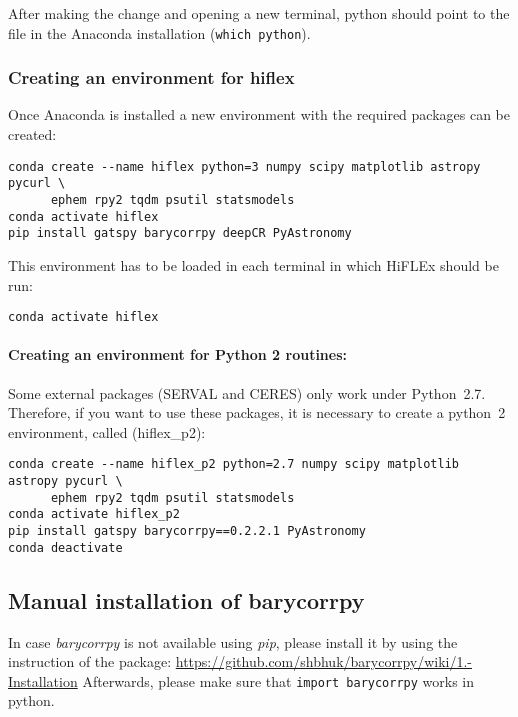 \documentclass[10pt,a4paper]{article}
\begin{document}
After making the change and opening a new terminal, python should point to the file in the Anaconda installation (\verb|which python|).

\subsubsection{Creating an environment for hiflex}
\label{Sec:Creating_conda_environment}
\noindent Once Anaconda is installed a new environment with the required packages can be created:

\begin{lstlisting}[style=base]
conda create --name hiflex python=3 numpy scipy matplotlib astropy pycurl \
      ephem rpy2 tqdm psutil statsmodels
conda activate hiflex
pip install gatspy barycorrpy deepCR PyAstronomy
\end{lstlisting}

This environment has to be loaded in each terminal in which HiFLEx should be run:
\begin{lstlisting}[style=base]
conda activate hiflex
\end{lstlisting}

\paragraph{Creating an environment for Python 2 routines:}
Some external packages (SERVAL and CERES) only work under Python~2.7. Therefore, if you want to use these packages, it is necessary to create a python~2 environment, called (hiflex\_p2):
\begin{lstlisting}[style=base]
conda create --name hiflex_p2 python=2.7 numpy scipy matplotlib astropy pycurl \
      ephem rpy2 tqdm psutil statsmodels
conda activate hiflex_p2
pip install gatspy barycorrpy==0.2.2.1 PyAstronomy
conda deactivate
\end{lstlisting}

\subsection{Manual installation of barycorrpy }
In case \textit{barycorrpy} is not available using \textit{pip}, please install it by using the instruction of the package: \url{https://github.com/shbhuk/barycorrpy/wiki/1.-Installation}
Afterwards, please make sure that \verb|import barycorrpy| works in python.

\end{document}
